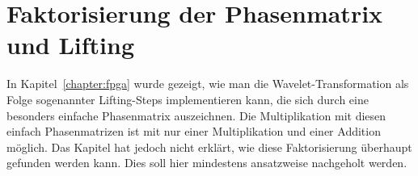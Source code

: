 %
%
%
\chapter{Faktorisierung der Phasenmatrix und Lifting
\label{chapter:lifting}}
\rhead{}
\begin{refsection}

In Kapitel~\ref{chapter:fpga} wurde gezeigt, wie man die
Wavelet-Transformation als Folge sogenannter Lifting-Steps implementieren
kann, die sich durch eine besonders einfache Phasenmatrix auszeichnen.
Die Multiplikation mit diesen einfach Phasenmatrizen ist mit nur
einer Multiplikation und einer Addition möglich.
Das Kapitel hat jedoch nicht erklärt, wie diese Faktorisierung
überhaupt gefunden werden kann.
Dies soll hier mindestens ansatzweise nachgeholt werden.




\printbibliography[heading=subbibliography]
\end{refsection}
